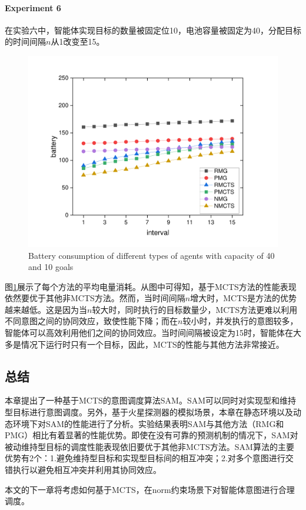 \paragraph{Experiment 6}
在实验六中，智能体实现目标的数量被固定位10，电池容量被固定为40，分配目标的时间间隔$n$从1改变至15。
\begin{figure}[h!]
\centering
\includegraphics[scale=0.4]{./figs/iX_cY_fixCap40G10}
\captionsetup{justification=centering}
\caption{Battery consumption of different types of agents with capacity of 40 and 10 goals}
\label{fig:dynamic3}
\end{figure}

图\ref{fig:dynamic3}展示了每个方法的平均电量消耗。从图中可得知，基于MCTS方法的性能表现依然要优于其他非MCTS方法。然而，当时间间隔$n$增大时，MCTS是方法的优势越来越低。这是因为当$n$较大时，同时执行的目标数量少，MCTS方法更难以利用不同意图之间的协同效应，致使性能下降；而在$n$较小时，并发执行的意图较多，智能体可以高效利用他们之间的协同效应。当时间间隔被设定为15时，智能体在大多是情况下运行时只有一个目标，因此，MCTS的性能与其他方法非常接近。
\subsection{总结}
本章提出了一种基于MCTS的意图调度算法SAM。SAM可以同时对实现型和维持型目标进行意图调度。另外，基于火星探测器的模拟场景，本章在静态环境以及动态环境下对SAM的性能进行了分析。实验结果表明SAM与其他方法（RMG和PMG）相比有着显著的性能优势。即使在没有可靠的预测机制的情况下，SAM对被动维持型目标的调度性能表现依旧要优于其他非MCTS方法。SAM算法的主要优势有2个：1.避免维持型目标和实现型目标间的相互冲突；2.对多个意图进行交错执行以避免相互冲突并利用其协同效应。

本文的下一章将考虑如何基于MCTS，在norm约束场景下对智能体意图进行合理调度。
